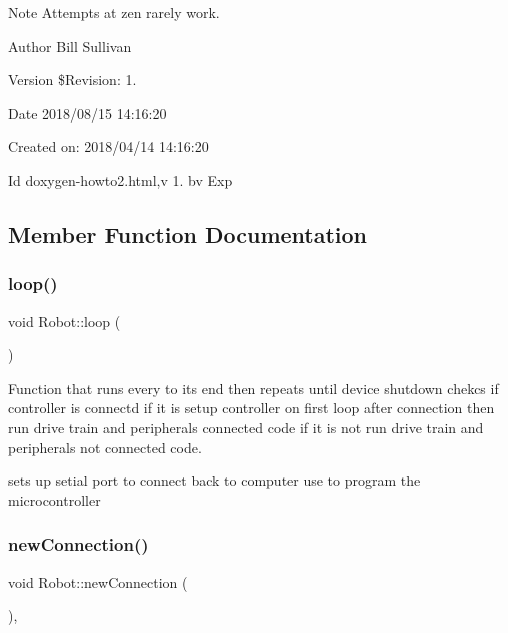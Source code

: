 \begin{DoxyNote}{Note}
Attempts at zen rarely work.
\end{DoxyNote}
\begin{DoxyAuthor}{Author}
Bill Sullivan
\end{DoxyAuthor}
\begin{DoxyVersion}{Version}
\$\+Revision\+: 1.
\end{DoxyVersion}
\begin{DoxyDate}{Date}
2018/08/15 14\+:16\+:20
\end{DoxyDate}
Created on\+: 2018/04/14 14\+:16\+:20

\begin{DoxyParagraph}{Id}
doxygen-\/howto2.\+html,v 1. bv Exp 
\end{DoxyParagraph}


\subsection{Member Function Documentation}
\mbox{\label{class_robot_ad92e1e27045a02533f55ecab2b16d368}} 
\subsubsection{\texorpdfstring{loop()}{loop()}}
{\footnotesize\ttfamily void Robot\+::loop (\begin{DoxyParamCaption}{ }\end{DoxyParamCaption})\hspace{0.3cm}{\ttfamily [inline]}}



Function that runs every to its end then repeats until device shutdown chekcs if controller is connectd if it is setup controller on first loop after connection then run drive train and peripheral\textquotesingle{}s connected code if it is not run drive train and peripheral\textquotesingle{}s not connected code. 

sets up setial port to connect back to computer use to program the microcontroller \mbox{\label{class_robot_aca73cd3e3582f49cc0b33ee900cbc245}} 
\subsubsection{\texorpdfstring{new\+Connection()}{newConnection()}}
{\footnotesize\ttfamily void Robot\+::new\+Connection (\begin{DoxyParamCaption}{ }\end{DoxyParamCaption})\hspace{0.3cm}{\ttfamily [inline]}, {\ttfamily [protected]}}



